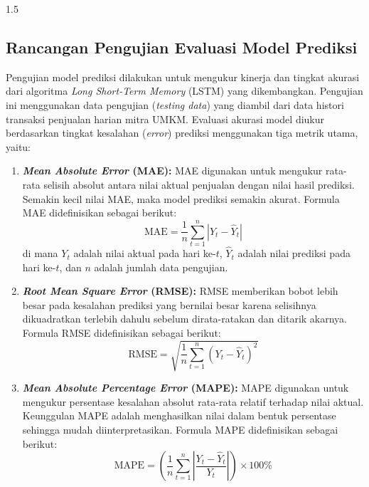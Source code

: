 \documentclass[12pt, a4paper, onecolumn, oneside]{report}
\begin{document}
\begin{spacing}{1.5}
\subsection{Rancangan Pengujian Evaluasi Model Prediksi}

Pengujian model prediksi dilakukan untuk mengukur kinerja dan tingkat akurasi dari algoritma \textit{Long Short-Term Memory} (LSTM) yang dikembangkan. Pengujian ini menggunakan data pengujian (\textit{testing data}) yang diambil dari data histori transaksi penjualan harian mitra UMKM. Evaluasi akurasi model diukur berdasarkan tingkat kesalahan (\textit{error}) prediksi menggunakan tiga metrik utama, yaitu:

\begin{enumerate}
    \item \textbf{\textit{Mean Absolute Error} (MAE):}
    MAE digunakan untuk mengukur rata-rata selisih absolut antara nilai aktual penjualan dengan nilai hasil prediksi. Semakin kecil nilai MAE, maka model prediksi semakin akurat. Formula MAE didefinisikan sebagai berikut:
    \begin{equation}
        \text{MAE} = \frac{1}{n} \sum_{t=1}^{n} |Y_t - \hat{Y}_t|
    \end{equation}
    di mana $Y_t$ adalah nilai aktual pada hari ke-$t$, $\hat{Y}_t$ adalah nilai prediksi pada hari ke-$t$, dan $n$ adalah jumlah data pengujian.

    \item \textbf{\textit{Root Mean Square Error} (RMSE):}
    RMSE memberikan bobot lebih besar pada kesalahan prediksi yang bernilai besar karena selisihnya dikuadratkan terlebih dahulu sebelum dirata-ratakan dan ditarik akarnya. Formula RMSE didefinisikan sebagai berikut:
    \begin{equation}
        \text{RMSE} = \sqrt{\frac{1}{n} \sum_{t=1}^{n} (Y_t - \hat{Y}_t)^2}
    \end{equation}

    \item \textbf{\textit{Mean Absolute Percentage Error} (MAPE):}
    MAPE digunakan untuk mengukur persentase kesalahan absolut rata-rata relatif terhadap nilai aktual. Keunggulan MAPE adalah menghasilkan nilai dalam bentuk persentase sehingga mudah diinterpretasikan. Formula MAPE didefinisikan sebagai berikut:
    \begin{equation}
        \text{MAPE} = \left( \frac{1}{n} \sum_{t=1}^{n} \left| \frac{Y_t - \hat{Y}_t}{Y_t} \right| \right) \times 100\%
    \end{equation}
\end{enumerate}


\end{spacing}
\end{document}
